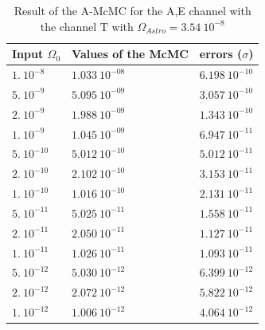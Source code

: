 \documentclass[a4paper,12pt]{article}
\begin{document}
\begin{table}[H]
\begin{center}
\begin{tabular}{|l|l|l|}
\hline
Input $\Omega_0$    & Values of the McMC     & errors ($\sigma$)    \\ \hline
$1. \ 10^{-8}$      & $1.033 \ 10^{-08}$     & $6.198 \ 10^{-10}$   \\ \hline
$5. \ 10^{-9}$      & $5.095 \ 10^{-09}$     & $3.057 \ 10^{-10}$   \\ \hline
$2. \ 10^{-9}$      & $1.988 \ 10^{-09}$     & $1.343 \ 10^{-10}$   \\ \hline
$1. \ 10^{-9}$      & $1.045 \ 10^{-09}$     & $6.947 \ 10^{-11}$   \\ \hline
$5. \ 10^{-10}$     & $5.012 \ 10^{-10}$     & $5.012 \ 10^{-11}$   \\ \hline
$2. \ 10^{-10}$     & $2.102 \ 10^{-10}$     & $3.153 \ 10^{-11}$   \\ \hline
$1. \ 10^{-10}$     & $1.016 \ 10^{-10}$     & $2.131 \ 10^{-11}$   \\ \hline
$5. \ 10^{-11}$     & $5.025 \ 10^{-11}$     & $1.558 \ 10^{-11}$   \\ \hline
$2. \ 10^{-11}$     & $2.050 \ 10^{-11}$     & $1.127 \ 10^{-11}$   \\ \hline
$1. \ 10^{-11}$     & $1.026 \ 10^{-11}$     & $1.093 \ 10^{-11}$   \\ \hline
$5. \ 10^{-12}$     & $5.030 \ 10^{-12}$     & $6.399 \ 10^{-12}$   \\ \hline
$2. \ 10^{-12}$     & $2.072 \ 10^{-12}$     & $5.822 \ 10^{-12}$   \\ \hline
$1. \ 10^{-12}$     & $1.006 \ 10^{-12}$     & $4.064 \ 10^{-12}$   \\ \hline
\end{tabular}
\end{center}
\caption{Result of the A-McMC for the A,E channel with the channel T with $\Omega_{Astro} = 3.54 \ 10^{-8}$}
\label{table:resultA+E+T-8}
\end{table}
\end{document}
